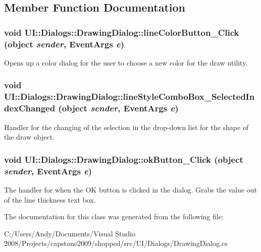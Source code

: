 \subsection{Member Function Documentation}
\hypertarget{class_u_i_1_1_dialogs_1_1_drawing_dialog_a14fc47e4971a3fadfcbcf99be9c3eb4e}{
\subsubsection[{lineColorButton\_\-Click}]{\setlength{\rightskip}{0pt plus 5cm}void UI::Dialogs::DrawingDialog::lineColorButton\_\-Click (object {\em sender}, \/  EventArgs {\em e})}}
\label{class_u_i_1_1_dialogs_1_1_drawing_dialog_a14fc47e4971a3fadfcbcf99be9c3eb4e}
Opens up a color dialog for the user to choose a new color for the draw utility. \hypertarget{class_u_i_1_1_dialogs_1_1_drawing_dialog_acda4517c3c2401d544727990f18b8ef6}{
\subsubsection[{lineStyleComboBox\_\-SelectedIndexChanged}]{\setlength{\rightskip}{0pt plus 5cm}void UI::Dialogs::DrawingDialog::lineStyleComboBox\_\-SelectedIndexChanged (object {\em sender}, \/  EventArgs {\em e})}}
\label{class_u_i_1_1_dialogs_1_1_drawing_dialog_acda4517c3c2401d544727990f18b8ef6}
Handler for the changing of the selection in the drop-\/down list for the shape of the draw object. \hypertarget{class_u_i_1_1_dialogs_1_1_drawing_dialog_a4c405e122958325c0f07fd98ccff8bf2}{
\subsubsection[{okButton\_\-Click}]{\setlength{\rightskip}{0pt plus 5cm}void UI::Dialogs::DrawingDialog::okButton\_\-Click (object {\em sender}, \/  EventArgs {\em e})}}
\label{class_u_i_1_1_dialogs_1_1_drawing_dialog_a4c405e122958325c0f07fd98ccff8bf2}
The handler for when the OK button is clicked in the dialog. Grabs the value out of the line thickness text box. 

The documentation for this class was generated from the following file:\begin{DoxyCompactItemize}
\item 
C:/Users/Andy/Documents/Visual Studio 2008/Projects/capstone2009/shopped/src/UI/Dialogs/DrawingDialog.cs\end{DoxyCompactItemize}
